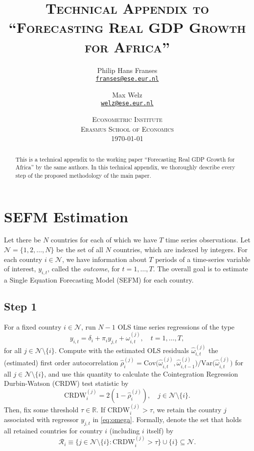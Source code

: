 \documentclass{article}
\title{\textsc{Technical Appendix to ``Forecasting Real GDP Growth for Africa''}}
\author{Philip Hans Franses \\
  \href{mailto:franses@ese.eur.nl}{\texttt{franses@ese.eur.nl}}
  \and
  Max Welz \\
  \href{mailto:welz@ese.eur.nl}{\texttt{welz@ese.eur.nl}}}
\date{%
    \textsc{Econometric Institute\\ Erasmus School of Economics}\\[2ex]%
    \today}
\begin{document}
\maketitle

\begin{abstract}
   \noindent This is a technical appendix to the working paper ``Forecasting Real GDP Growth for Africa'' by the same authors. In this technical appendix, we thoroughly describe every step of the proposed methodology of the main paper.
\end{abstract}

\section{SEFM Estimation}
Let there be $N$ countries for each of which we have $T$ time series observations. Let $\mathcal{N} = \{1,2,\dots,N\}$ be the set of all $N$ countries, which are indexed by integers. For each country $i \in \mathcal{N}$, we have information about $T$ periods of a time-series variable of interest, $y_{i,t}$, called the \textit{outcome}, for $t=1,\dots,T$. The overall goal is to estimate a Single Equation Forecasting Model (SEFM) for each country.

\subsection{Step 1}
For a fixed country $i \in \mathcal{N}$, run $N-1$ OLS time series regressions of the type
\begin{equation}
    y_{i,t} = \delta_i + \pi_i y_{j,t} + \omega_{i,t}^{(j)}, \quad t=1,\dots,T, \label{eq:omega}
\end{equation}
for all $j \in \mathcal{N}\setminus \{i\}$. Compute with the estimated OLS residuals $\hat{\omega}_{i,t}^{(j)}$ the (estimated) first order autocorrelation $\hat{\rho}_i^{(j)} = \text{Cov} \big( \hat{\omega}_{i,t}^{(j)}, \hat{\omega}_{i,t-1}^{(j)} \big) / \text{Var} \big( \hat{\omega}_{i,t}^{(j)} \big)$ for all $j \in \mathcal{N}\setminus\{i\}$, and use this quantity to calculate the Cointegration Regression Durbin-Watson (CRDW) test statistic by
 \begin{equation}
     \text{CRDW}_i^{(j)} = 2(1 - \hat{\rho}_i^{(j)}), \quad j \in \mathcal{N}\setminus \{i\}.
 \end{equation}
Then, fix some threshold $\tau \in \mathbb{R}$. If $\text{CRDW}_i^{(j)} > \tau$, we retain the country $j$ associated with regressor $y_{j,t}$ in \eqref{eq:omega}. 
Formally, denote the set that holds all retained countries for country $i$ (including $i$ itself) by 
\[
\mathcal{R}_i \equiv \big\{ j \in \mathcal{N}\setminus \{i\} : \text{CRDW}_i^{(j)} >\tau \big\} \cup \{i\} \subseteq \mathcal{N}.
\]
\end{document}

